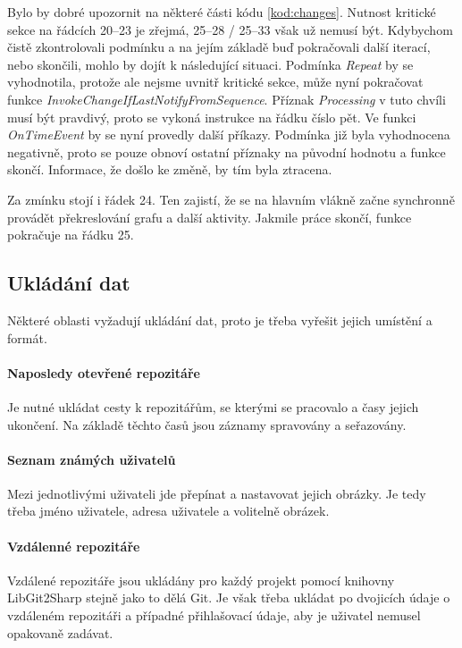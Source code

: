 \documentclass[
  biblatex,
  glossaries,
  index
]{kidiplom}
\begin{document}
Bylo by dobré upozornit na některé části kódu \ref{kod:changes}. Nutnost kritické sekce na řádcích 20--23 je zřejmá, 25--28 / 25--33 však už nemusí být. Kdybychom čistě zkontrolovali podmínku a na jejím základě buď pokračovali další iterací, nebo skončili, mohlo by dojít k následující situaci. Podmínka {\it Repeat} by se vyhodnotila, protože ale nejsme uvnitř kritické sekce, může nyní pokračovat funkce {\it InvokeChangeIfLastNotifyFromSequence}. Příznak {\it Processing} v tuto chvíli musí být pravdivý, proto se vykoná instrukce na řádku číslo pět. Ve funkci {\it OnTimeEvent} by se nyní provedly další příkazy. Podmínka již byla vyhodnocena negativně, proto se pouze obnoví ostatní příznaky na původní hodnotu a funkce skončí. Informace, že došlo ke změně, by tím byla ztracena.

Za zmínku stojí i řádek 24. Ten zajistí, že se na hlavním vlákně začne synchronně provádět překreslování grafu a další aktivity. Jakmile práce skončí, funkce pokračuje na řádku 25.

\subsection{Ukládání dat}
Některé oblasti vyžadují ukládání dat, proto je třeba vyřešit jejich umístění a formát.

\paragraph*{Naposledy otevřené repozitáře}
Je nutné ukládat cesty k repozitářům, se kterými se pracovalo a časy jejich ukončení. Na základě těchto časů jsou záznamy spravovány a seřazovány.

\paragraph*{Seznam známých uživatelů}
Mezi jednotlivými uživateli jde přepínat a nastavovat jejich obrázky. Je tedy třeba jméno uživatele, adresa uživatele a volitelně obrázek.

\paragraph*{Vzdálenné repozitáře}
Vzdálené repozitáře jsou ukládány pro každý projekt pomocí knihovny LibGit2Sharp stejně jako to dělá Git. Je však třeba ukládat po dvojicích údaje o vzdáleném repozitáři a případné přihlašovací údaje, aby je uživatel nemusel opakovaně zadávat.
\end{document}
